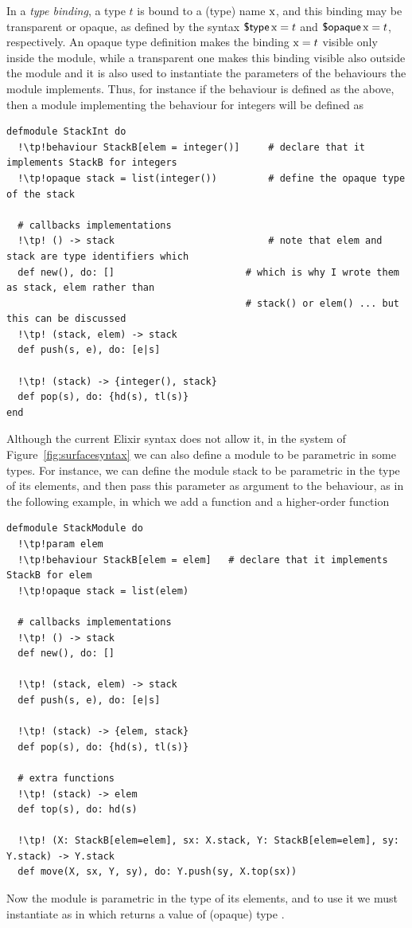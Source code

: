\documentclass[a4paper,10pt]{article}
\begin{document}
In a \emph{type binding}, a type $t$ is bound to a (type) name $\text{\rm x}$, and this binding may be transparent or opaque, as defined by the syntax $\operatorname{\textsf{\$type}} \text{\rm x} = t$ and $\operatorname{\textsf{\$opaque}} \text{\rm x} =t$, respectively. An opaque type definition makes the binding $\text{\rm x}= t$ visible only inside the module, while a transparent one makes this binding visible also outside the module and it is also used to instantiate the parameters of the behaviours the module implements. Thus, for instance if the behaviour  is defined as the above, then a module  implementing the behaviour for integers will be defined as
\begin{verbatim}
defmodule StackInt do            
  !\tp!behaviour StackB[elem = integer()]     # declare that it implements StackB for integers
  !\tp!opaque stack = list(integer())         # define the opaque type of the stack

  # callbacks implementations
  !\tp! () -> stack                           # note that elem and stack are type identifiers which
  def new(), do: []                       # which is why I wrote them as stack, elem rather than  
                                          # stack() or elem() ... but this can be discussed
  !\tp! (stack, elem) -> stack
  def push(s, e), do: [e|s] 

  !\tp! (stack) -> {integer(), stack}
  def pop(s), do: {hd(s), tl(s)} 
end
\end{verbatim}
Although the current Elixir syntax does not allow it, in the system of Figure~\ref{fig:surfacesyntax} we can also define a module to be parametric in some types. For instance, we can define the module stack to be parametric in the type of
its elements, and then pass this parameter as argument to the behaviour, as in
the following example, in which we add a   function and  a
higher-order function 
\begin{verbatim}
defmodule StackModule do
  !\tp!param elem
  !\tp!behaviour StackB[elem = elem]   # declare that it implements StackB for elem
  !\tp!opaque stack = list(elem)

  # callbacks implementations
  !\tp! () -> stack
  def new(), do: []

  !\tp! (stack, elem) -> stack
  def push(s, e), do: [e|s] 

  !\tp! (stack) -> {elem, stack}
  def pop(s), do: {hd(s), tl(s)} 

  # extra functions
  !\tp! (stack) -> elem
  def top(s), do: hd(s)

  !\tp! (X: StackB[elem=elem], sx: X.stack, Y: StackB[elem=elem], sy: Y.stack) -> Y.stack
  def move(X, sx, Y, sy), do: Y.push(sy, X.top(sx))
\end{verbatim}
Now the module  is parametric in the type of its elements, and to use it we must instantiate as in  which returns a value of (opaque) type .
\end{document}

